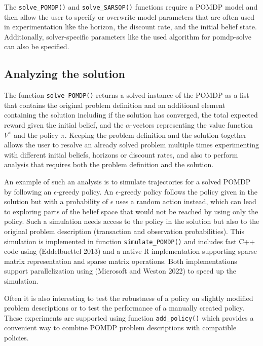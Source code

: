 The \texttt{solve\_POMDP()} and \texttt{solve\_SARSOP()} functions require a POMDP model and then
allow the user to specify or overwrite model parameters that are often used in experimentation
like the horizon, the discount rate, and the initial belief state. Additionally, solver-specific parameters
like the used algorithm for pomdp-solve can also be specified.

\hypertarget{analyzing-the-solution}{%
\subsection{Analyzing the solution}\label{analyzing-the-solution}}

The function \texttt{solve\_POMDP()} returns a solved instance of the POMDP as a list that contains the original
problem definition and an additional element
containing the solution including if the solution has converged, the total expected reward given the initial belief, and the \(\alpha\)-vectors representing the value function \(V^\pi\) and the policy \(\pi\).
Keeping the problem definition and the solution together allows the user to
resolve an already solved problem multiple times experimenting with different initial beliefs, horizons or
discount rates,
and also to perform
analysis that requires both the problem definition and the solution.

An example of such an analysis is to simulate trajectories for a solved POMDP by following
an \(\epsilon\)-greedy policy.
An \(\epsilon\)-greedy policy follows the policy given in the solution but with a probability of \(\epsilon\) uses a random action instead,
which can lead to exploring parts of the belief space that would not be reached by using only the policy.
Such a simulation needs access to the policy in the solution but also to the original problem description
(transaction and observation probabilities). This simulation is implemented in function \texttt{simulate\_POMDP()}
and includes fast C++ code using  (Eddelbuettel 2013) and a native R implementation supporting
sparse matrix representation and sparse matrix operations.
Both implementations support parallelization using  (Microsoft and Weston 2022)
to speed up the simulation.

Often it is also interesting to test the robustness
of a policy on slightly modified problem descriptions or to test
the performance of a manually created policy. These experiments are supported
using function \texttt{add\_policy()} which provides a convenient way to combine POMDP problem descriptions with compatible policies.

